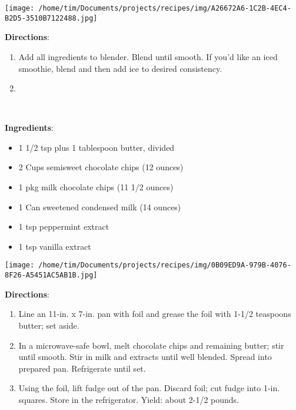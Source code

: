 \documentclass[11pt, twoside, openany]{book}
\begin{document}
\begin{minipage}[t]{0.2\linewidth}
\centering \strut\vspace*{-\baselineskip}\newline
\texttt{[image: /home/tim/Documents/projects/recipes/img/A26672A6-1C2B-4EC4-B2D5-3510B7122488.jpg]}\\
\end{minipage}\vspace{3mm}
\textbf{Directions}:
\vspace{-3mm}\begin{enumerate}\setlength\itemsep{-1mm}
\item  Add all ingredients to blender. Blend until smooth. If you'd like an iced smoothie, blend and then add ice to desired consistency.
\item  
\end{enumerate}
 \label{bavarian-mint-fudge-recipe}\hfill\textit{}\\
\begin{minipage}[t]{0.8\linewidth}
\textbf{Ingredients}:\vspace{-3mm}
\begin{multicols}{2}
\begin{itemize}\setlength\itemsep{-1mm}
\item 1 1/2 tsp plus 1 tablespoon butter, divided
\item 2 Cups semisweet chocolate chips (12 ounces)
\item 1 pkg milk chocolate chips (11 1/2 ounces)
\item 1 Can sweetened condensed milk (14 ounces)
\item 1 tsp peppermint extract
\item 1 tsp vanilla extract
\end{itemize}
\end{multicols}
\end{minipage}
\begin{minipage}[t]{0.2\linewidth}
\centering \strut\vspace*{-\baselineskip}\newline
\texttt{[image: /home/tim/Documents/projects/recipes/img/0B09ED9A-979B-4076-8F26-A5451AC5AB1B.jpg]}\\
\end{minipage}\vspace{3mm}
\textbf{Directions}:
\vspace{-3mm}\begin{enumerate}\setlength\itemsep{-1mm}
\item Line an 11-in. x 7-in. pan with foil and grease the foil with 1-1/2 teaspoons butter; set aside. 
\item  In a microwave-safe bowl, melt chocolate chips and remaining butter; stir until smooth. Stir in milk and extracts until well blended. Spread into prepared pan. Refrigerate until set. 
\item  Using the foil, lift fudge out of the pan. Discard foil; cut fudge into 1-in. squares. Store in the refrigerator. Yield: about 2-1/2 pounds.
\end{enumerate}
\end{document}
